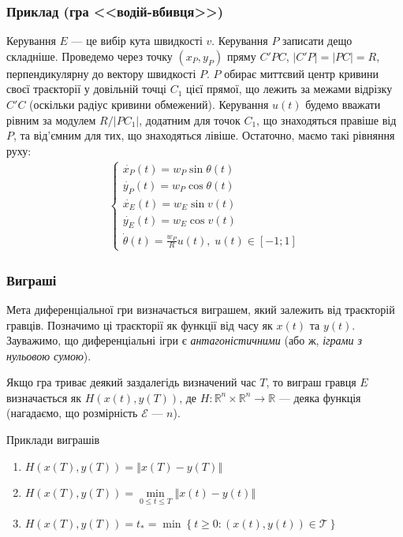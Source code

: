 \documentclass[10pt,pdf]{beamer}
\newcommand{\R}{\mathbb{R}}
\renewcommand{\d}[1]{\dot{#1}}
\newcommand{\E}{\mathcal{E}}
\newcommand{\T}{\mathcal{T}}
\renewcommand{\l}{\left}
\renewcommand{\r}{\right}
\newcommand{\norm}[1]{\left\Vert #1 \right\Vert}
\begin{document}
    \begin{frame}
        \frametitle{Приклад (гра <<водій-вбивця>>)}
        Керування $E$ --- це вибір кута швидкості $v$. Керування $P$ записати дещо складніше. Проведемо через точку $(x_P, y_P)$
        пряму $C' P C$, $|C' P| = |P C| = R$, перпендикулярну до вектору швидкості $P$. $P$ обирає миттєвий центр кривини своєї траєкторії у довільній точці $C_1$ цієї
        прямої, що лежить за межами відрізку $C' C$ (оскільки радіус кривини обмежений). Керування $u(t)$ будемо вважати рівним за модулем
        $R / |P C_1|$, додатним для точок $C_1$, що знаходяться правіше від $P$, та від'ємним для тих, що знаходяться лівіше. Остаточно, маємо такі рівняння руху:
        \begin{gather*}
            \begin{cases}
                \d{x_P}(t) = w_P \sin \theta(t) \\
                \d{y_P}(t) = w_P \cos \theta(t) \\
                \d{x_E}(t) = w_E \sin v(t) \\
                \d{y_E}(t) = w_E \cos v(t) \\
                \d{\theta}(t) = \frac{w_P}{R} u(t), \; u(t) \in [-1; 1]
            \end{cases}
        \end{gather*}
    \end{frame}
    \begin{frame}
        \frametitle{Виграші}
    
        Мета диференціальної гри визначається виграшем, який залежить від траєкторій гравців. 
        Позначимо ці траєкторії як функції від часу як $x(t)$ та $y(t)$. 
        Зауважимо, що диференціальні ігри є \emph{антагоністичними} (або ж, \emph{іграми з нульовою сумою}).

        Якщо гра триває деякий заздалегідь визначений час $T$, то виграш гравця $E$ визначається
        як $H(x(t), y(T))$, де $H : \R^n \times \R^n \to \R$ --- деяка функція (нагадаємо, що розмірність $\E$ --- $n$).

        \begin{block}{Приклади виграшів}
            \begin{enumerate}
                \item $H(x(T), y(T)) = \norm{x(T) - y(T)}$
                \item $H(x(T), y(T)) = \underset{0 \leq t \leq T}{\min} \norm{x(t) - y(t)}$
                \item $H(x(T), y(T)) = t_* = \min \l\{ t \geq 0 : (x(t), y(t)) \in \T\r\}$
            \end{enumerate}
        \end{block}
    \end{frame}
\end{document}
